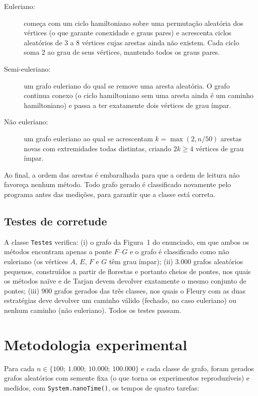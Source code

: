 \documentclass[a4paper,11pt]{article}
\begin{document}
\begin{description}
  \item[Euleriano:] começa com um ciclo hamiltoniano sobre uma permutação aleatória dos vértices
        (o que garante conexidade e graus pares) e acrescenta ciclos aleatórios de 3 a 8 vértices cujas
        arestas ainda não existem. Cada ciclo soma 2 ao grau de seus vértices, mantendo todos os graus pares.
  \item[Semi-euleriano:] um grafo euleriano do qual se remove uma aresta aleatória. O grafo continua
        conexo (o ciclo hamiltoniano sem uma aresta ainda é um caminho hamiltoniano) e passa a ter
        exatamente dois vértices de grau ímpar.
  \item[Não euleriano:] um grafo euleriano ao qual se acrescentam $k=\max(2, n/50)$ arestas novas com
        extremidades todas distintas, criando $2k\ge 4$ vértices de grau ímpar.
\end{description}

Ao final, a ordem das arestas é embaralhada para que a ordem de leitura não favoreça nenhum método.
Todo grafo gerado é classificado novamente pelo programa antes das medições, para garantir que a classe
está correta.

\subsection{Testes de corretude}

A classe \texttt{Testes} verifica: (i) o grafo da Figura~1 do enunciado, em que ambos os métodos
encontram apenas a ponte $F$--$G$ e o grafo é classificado como não euleriano (os vértices $A$, $E$, $F$
e $G$ têm grau ímpar); (ii) 3.000 grafos aleatórios pequenos, construídos a partir de florestas e
portanto cheios de pontes, nos quais os métodos naïve e de Tarjan devem devolver exatamente o mesmo
conjunto de pontes; (iii) 900 grafos gerados das três classes, nos quais o Fleury com as duas estratégias
deve devolver um caminho válido (fechado, no caso euleriano) ou nenhum caminho (não euleriano).
Todos os testes passam.

\section{Metodologia experimental}

Para cada $n\in\{100;\ 1.000;\ 10.000;\ 100.000\}$ e cada classe de grafo, foram gerados grafos
aleatórios com semente fixa (o que torna os experimentos reproduzíveis) e medidos, com
\texttt{System.nanoTime()}, os tempos de quatro tarefas:
\end{document}
